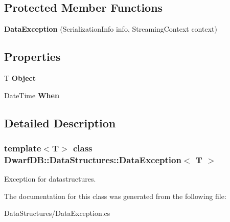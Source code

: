 \subsection*{Protected Member Functions}
\begin{DoxyCompactItemize}
\item 
\hypertarget{class_dwarf_d_b_1_1_data_structures_1_1_data_exception-g_a23f040d93fb5573f115041b9bfc4d75e}{
{\bfseries DataException} (SerializationInfo info, StreamingContext context)}
\label{class_dwarf_d_b_1_1_data_structures_1_1_data_exception-g_a23f040d93fb5573f115041b9bfc4d75e}

\end{DoxyCompactItemize}
\subsection*{Properties}
\begin{DoxyCompactItemize}
\item 
\hypertarget{class_dwarf_d_b_1_1_data_structures_1_1_data_exception-g_a0ac0e2172d354ec3554b28959a9b7772}{
T {\bfseries Object}}
\label{class_dwarf_d_b_1_1_data_structures_1_1_data_exception-g_a0ac0e2172d354ec3554b28959a9b7772}

\item 
\hypertarget{class_dwarf_d_b_1_1_data_structures_1_1_data_exception-g_a4d68408ff2bb7810d4ece2764efc1d1c}{
DateTime {\bfseries When}}
\label{class_dwarf_d_b_1_1_data_structures_1_1_data_exception-g_a4d68408ff2bb7810d4ece2764efc1d1c}

\end{DoxyCompactItemize}


\subsection{Detailed Description}
\subsubsection*{template$<$T$>$ class DwarfDB::DataStructures::DataException$<$ T $>$}

Exception for datastructures. 

The documentation for this class was generated from the following file:\begin{DoxyCompactItemize}
\item 
DataStructures/DataException.cs\end{DoxyCompactItemize}
